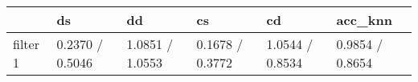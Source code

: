 \begin{tabular}{llllll}
\toprule
{} &               ds &               dd &               cs &               cd &          acc\_knn \\
\midrule
filter 1 &  0.2370 / 0.5046 &  1.0851 / 1.0553 &  0.1678 / 0.3772 &  1.0544 / 0.8534 &  0.9854 / 0.8654 \\
\bottomrule
\end{tabular}
